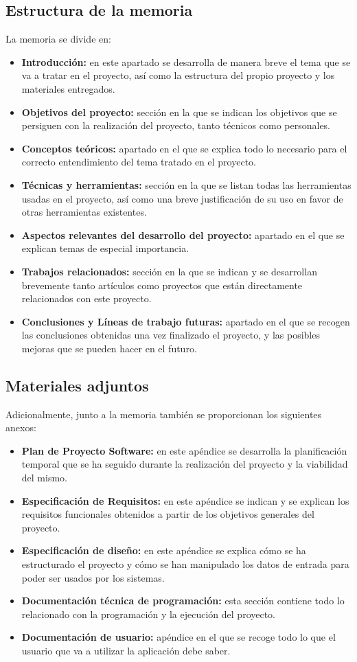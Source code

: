 \subsection{Estructura de la memoria}\label{estructura-memoria}
La memoria se divide en:
\begin{itemize}
\tightlist
\item \textbf{Introducción:} en este apartado se desarrolla de manera breve el tema que se va a tratar en el proyecto, así como la estructura del propio proyecto y los materiales entregados.
\item \textbf{Objetivos del proyecto:} sección en la que se indican los objetivos que se persiguen con la realización del proyecto, tanto técnicos como personales.
\item \textbf{Conceptos teóricos:} apartado en el que se explica todo lo necesario para el correcto entendimiento del tema tratado en el proyecto.
\item \textbf{Técnicas y herramientas:} sección en la que se listan todas las herramientas usadas en el proyecto, así como una breve justificación de su uso en favor de otras herramientas existentes.
\item \textbf{Aspectos relevantes del desarrollo del proyecto:} apartado en el que se explican temas de especial importancia.
\item \textbf{Trabajos relacionados:} sección en la que se indican y se desarrollan brevemente tanto artículos como proyectos que están directamente relacionados con este proyecto.
\item \textbf{Conclusiones y Líneas de trabajo futuras:} apartado en el que se recogen las conclusiones obtenidas una vez finalizado el proyecto, y las posibles mejoras que se pueden hacer en el futuro.
\end{itemize}

\subsection{Materiales adjuntos}\label{materiales-adjuntos}
Adicionalmente, junto a la memoria también se proporcionan los siguientes anexos:
\begin{itemize}
\tightlist
\item \textbf{Plan de Proyecto Software:} en este apéndice se desarrolla la planificación temporal que se ha seguido durante la realización del proyecto y la viabilidad del mismo.
\item \textbf{Especificación de Requisitos:} en este apéndice se indican y se explican los requisitos funcionales obtenidos a partir de los objetivos generales del proyecto.
\item \textbf{Especificación de diseño:} en este apéndice se explica cómo se ha estructurado el proyecto y cómo se han manipulado los datos de entrada para poder ser usados por los sistemas.
\item \textbf{Documentación técnica de programación:} esta sección contiene todo lo relacionado con la programación y la ejecución del proyecto.
\item \textbf{Documentación de usuario:} apéndice en el que se recoge todo lo que el usuario que va a utilizar la aplicación debe saber.
\end{itemize}